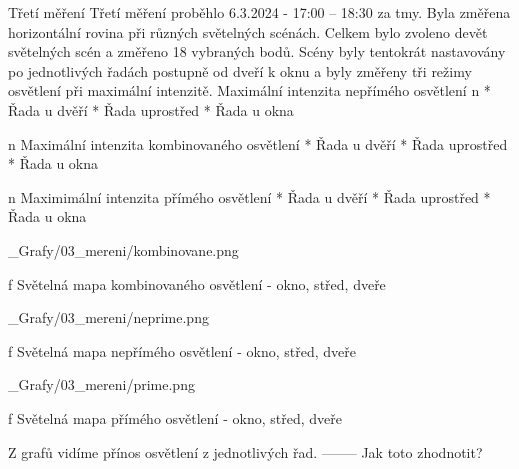 \sec Třetí měření
Třetí měření proběhlo 6.3.2024 - 17:00 – 18:30 za tmy. Byla změřena horizontální rovina při různých světelných scénách. Celkem bylo zvoleno devět světelných scén a změřeno 18 vybraných bodů. Scény byly tentokrát nastavovány po jednotlivých řadách postupně od dveří k oknu a byly změřeny tři režimy osvětlení při maximální intenzitě.
\medskip
{\sbf Maximální intenzita nepřímého osvětlení}
\medskip
\begitems \style n
    * Řada u dvěří
    \medskip
    * Řada uprostřed
    \medskip
    * Řada u okna
\enditems

\medskip
\begitems \style n
{\sbf Maximální intenzita kombinovaného osvětlení}
\medskip
    * Řada u dvěří
    \medskip
    * Řada uprostřed
    \medskip
    * Řada u okna
\enditems
\medskip

\begitems \style n
{\sbf Maximimální intenzita přímého osvětlení}
\medskip
    * Řada u dvěří
    \medskip
    * Řada uprostřed
    \medskip
    * Řada u okna
\enditems

\medskip {}
\picw=18cm _Grafy/03_mereni/kombinovane.png
\caption/f Světelná mapa kombinovaného osvětlení - okno, střed, dveře
\medskip

\medskip {}
\picw=18cm _Grafy/03_mereni/neprime.png
\caption/f Světelná mapa nepřímého osvětlení - okno, střed, dveře
\medskip

\medskip {}
\picw=18cm _Grafy/03_mereni/prime.png
\caption/f Světelná mapa přímého osvětlení - okno, střed, dveře
\medskip

Z grafů vidíme přínos osvětlení z jednotlivých řad. -------- Jak toto zhodnotit?